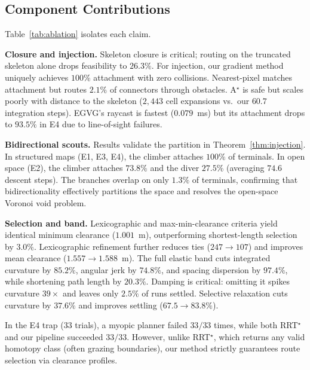 \documentclass[conference]{IEEEtran}
\begin{document}
\subsection{Component Contributions}

Table~\ref{tab:ablation} isolates each claim.

\textbf{Closure and injection.} Skeleton closure is critical; routing on the truncated skeleton alone drops feasibility to $26.3\%$. For injection, our gradient method uniquely achieves $100\%$ attachment with zero collisions. Nearest-pixel matches attachment but routes $2.1\%$ of connectors through obstacles. A$^\star$ is safe but scales poorly with distance to the skeleton ($2{,}443$ cell expansions vs.\ our $60.7$ integration steps). EGVG's raycast is fastest ($0.079$~ms) but its attachment drops to $93.5\%$ in E4 due to line-of-sight failures.

\textbf{Bidirectional scouts.} Results validate the partition in Theorem~\ref{thm:injection}. In structured maps (E1, E3, E4), the climber attaches $100\%$ of terminals. In open space (E2), the climber attaches $73.8\%$ and the diver $27.5\%$ (averaging $74.6$ descent steps). The branches overlap on only $1.3\%$ of terminals, confirming that bidirectionality effectively partitions the space and resolves the open-space Voronoi void problem.

\textbf{Selection and band.} Lexicographic and max-min-clearance criteria yield identical minimum clearance ($1.001$~m), outperforming shortest-length selection by $3.0\%$. Lexicographic refinement further reduces ties ($247\rightarrow107$) and improves mean clearance ($1.557\rightarrow1.588$~m). The full elastic band cuts integrated curvature by $85.2\%$, angular jerk by $74.8\%$, and spacing dispersion by $97.4\%$, while shortening path length by $20.3\%$. Damping is critical: omitting it spikes curvature $39\times$ and leaves only $2.5\%$ of runs settled. Selective relaxation cuts curvature by $37.6\%$ and improves settling ($67.5\rightarrow83.8\%$). 

In the E4 trap ($33$ trials), a myopic planner failed $33/33$ times, while both RRT$^\star$ and our pipeline succeeded $33/33$. However, unlike RRT$^\star$, which returns any valid homotopy class (often grazing boundaries), our method strictly guarantees route selection via clearance profiles.
\end{document}
